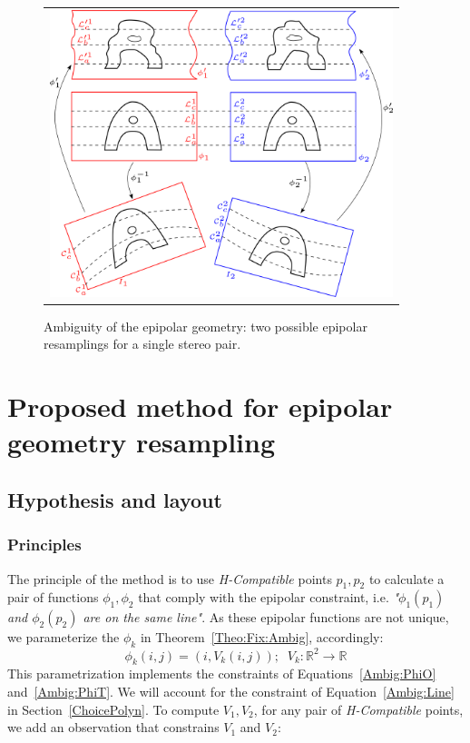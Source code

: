\documentclass{ipol}
\newcommand{\RR}{\ensuremath{\mathbb{R}}}
\begin{document}
\begin{figure}[h!]
\centering
\begin{tabular}{c}
\includegraphics[width=10cm]{FIGS/AmbigEpip.png}
\end{tabular}
\caption{Ambiguity of the epipolar geometry: two possible epipolar resamplings for a single stereo pair.}
\label{FigAmbigEpip}
\end{figure}


\section{Proposed method for epipolar geometry resampling}\label{sec:method}


\subsection{Hypothesis and layout}

\subsubsection{Principles}
The principle of the method is to use \emph{H-Compatible}  points $p_1,p_2$ to calculate a
pair of functions $\phi_1,\phi_2$ that comply with the epipolar constraint, i.e. 
\emph{"$\phi_1(p_1)$ and $\phi_2(p_2)$ are on the same line"}. As these epipolar functions
are not unique, we parameterize the $\phi_k$ in Theorem~\ref{Theo:Fix:Ambig}, accordingly:
%
\begin{equation}
    \phi_k(i,j) = (i,V_k(i,j)); \; \;
    V_k : \RR^2 \rightarrow \RR  
  \label{EpipVParam}
\end{equation}
%
This parametrization implements the constraints of Equations~\eqref{Ambig:PhiO} and~\eqref{Ambig:PhiT}. We will account for the constraint of  Equation~\eqref{Ambig:Line} in Section~\ref{ChoicePolyn}. %
To compute $V_1,V_2$, for any pair of \emph{H-Compatible} points, we add an observation that constrains $V_1$ and $V_2$:
\end{document}
